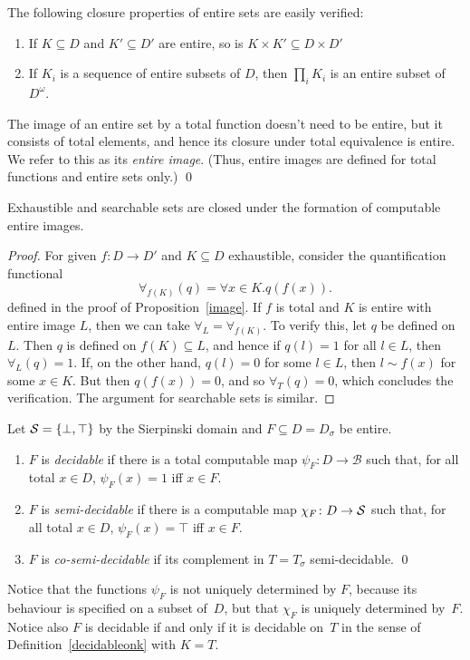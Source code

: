 \documentclass{LMCS}
\newcommand{\myomega}{\omega}
\newcommand{\licsmath}[1]{\[ #1 \]}
\newcommand{\pBool}{\mathcal{B}}
\newcommand{\True}{1}\newcommand{\False}{0}\newcommand{\domain}[1]{{\D_{#1}}}
\newcommand{\D}{D}
\begin{document}
\medskip
The following closure properties of entire sets are easily verified:
\begin{enumerate}
\item If $K \subseteq \D$ and $K' \subseteq \D'$ are entire, so is $K
  \times K' \subseteq \D \times \D'$
\item If $K_i$ is a sequence of entire subsets of $\D$, then
$\prod_i K_i$ is an entire subset of $\D^\myomega$.
\end{enumerate}
\begin{defi}
  The image of an entire set by a total function doesn't need to be
  entire, but it consists of total elements, and hence its closure
  under total equivalence is entire. We refer to this as its
  \emph{entire image}. (Thus, entire images are defined for total
  functions and entire sets only.) \qed
\end{defi}


\begin{prop} \label{image:bis} Exhaustible and searchable sets are
  closed under the formation of computable entire images.
\end{prop}
\begin{proof}
For given $f \colon \D \to \D'$ and $K \subseteq \D$ exhaustible,
consider the quantification functional
\licsmath{\forall_{f(K)}(q)=\forall x \in K.q(f(x)).}
defined in the proof of Proposition~\ref{image}.
If $f$ is total and $K$ is
entire with entire image $L$, then we can take
$\forall_{L}=\forall_{f(K)}$. To verify this, let $q$ be defined on
$L$. Then $q$ is defined on $f(K) \subseteq L$, and hence if
$q(l)=\True$ for all $l \in L$, then $\forall_{L}(q)=\True$. If, on the
other hand, $q(l)=\False$ for some $l \in L$, then $l \sim f(x)$ for
some $x \in K$. But then $q(f(x))=\False$, and so
$\forall_{T}(q)=\False$, which concludes the verification.
The argument for searchable sets is similar. 
\end{proof}

\begin{defi} \label{semidecidable} \leavevmode Let $\mathcal{S} = \{
  \bot, \top\}$ by the Sierpinski domain and $F \subseteq D=D_\sigma$
  be entire.
  \begin{enumerate}
  \item $F$ is \emph{decidable} if there is
    a total computable map $\psi_F \colon D \to \pBool$ such that, for
    all total $x \in D$, $\psi_F(x)=\True$ iff $x \in F$.

  \item $F$ is \emph{semi-decidable} if
    there is a computable map $\chi_F \colon D \to \mathcal{S}$ such that,
    for all total $x \in D$, $\psi_F(x)=\top$ iff $x \in F$.

  \item $F$ is \emph{co-semi-decidable} if its complement in
    $T=T_\sigma$ semi-decidable. \qed
  \end{enumerate}
\end{defi}
Notice that the functions $\psi_F$ is not uniquely determined by $F$,
because its behaviour is specified on a subset of~$D$, but that
$\chi_F$ is uniquely determined by~$F$. Notice also 
$F$ is decidable if and only if it is decidable on~$T$ in the sense of
Definition~\ref{decidableonk} with $K=T$.
\end{document}

